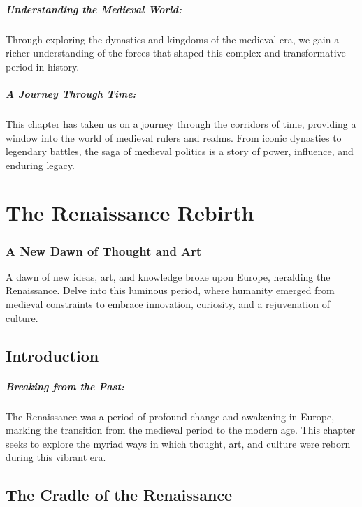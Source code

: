 \documentclass[a4paper,12pt]{book}
\begin{document}
\paragraph{Understanding the Medieval World:}
Through exploring the dynasties and kingdoms of the medieval era, we gain a richer understanding of the forces that shaped this complex and transformative period in history.

\paragraph{A Journey Through Time:}
This chapter has taken us on a journey through the corridors of time, providing a window into the world of medieval rulers and realms. From iconic dynasties to legendary battles, the saga of medieval politics is a story of power, influence, and enduring legacy.

\chapter{The Renaissance Rebirth}
\subsection*{A New Dawn of Thought and Art}
A dawn of new ideas, art, and knowledge broke upon Europe, heralding the Renaissance. Delve into this luminous period, where humanity emerged from medieval constraints to embrace innovation, curiosity, and a rejuvenation of culture.

\section*{Introduction}

\paragraph{Breaking from the Past:}
The Renaissance was a period of profound change and awakening in Europe, marking the transition from the medieval period to the modern age. This chapter seeks to explore the myriad ways in which thought, art, and culture were reborn during this vibrant era.

\section*{The Cradle of the Renaissance}
\end{document}
